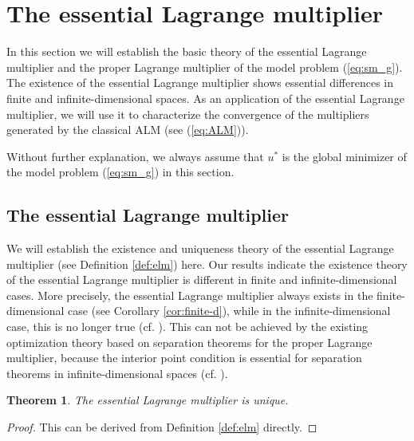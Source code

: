 \documentclass[leqno]{amsart}
\newtheorem{theorem}{Theorem}[section]
\theoremstyle{definition}
\begin{document}
\section{The essential Lagrange multiplier}\label{sec:ELM}
\setcounter{equation}{0}
In this section we will establish the basic theory of the essential Lagrange multiplier and the proper Lagrange multiplier of the model problem (\ref{eq:sm_g}). The existence of the essential Lagrange multiplier shows essential differences in finite and infinite-dimensional spaces. As an application of the essential Lagrange multiplier, we will use it to characterize the convergence of the multipliers generated by the classical ALM (see (\ref{eq:ALM})). 

Without further explanation, we always assume that $u^*$ is the global minimizer of the model problem (\ref{eq:sm_g}) in this section. 

\subsection{The essential Lagrange multiplier}
We will establish the existence and uniqueness theory of the essential Lagrange multiplier (see Definition \ref{def:elm}) here. Our results indicate the existence theory of the essential Lagrange multiplier is different in finite and infinite-dimensional cases. More precisely, the essential Lagrange multiplier always exists in the finite-dimensional case  (see Corollary \ref{cor:finite-d}), while in the infinite-dimensional case, this is no longer true (cf. \cite{hinze2008optimization, ito2008lagrange}). This can not be achieved by the existing optimization theory based on separation theorems for the proper Lagrange multiplier, because the interior point condition is essential for separation theorems in infinite-dimensional spaces (cf. \cite[Chapter 1, Remark 4]{brezis2011functional}).

\begin{theorem}\label{thm:ELM_unique}
The essential Lagrange multiplier is unique.
\end{theorem}
\begin{proof}
This can be derived from Definition \ref{def:elm} directly. 
\end{proof}
\end{document}
